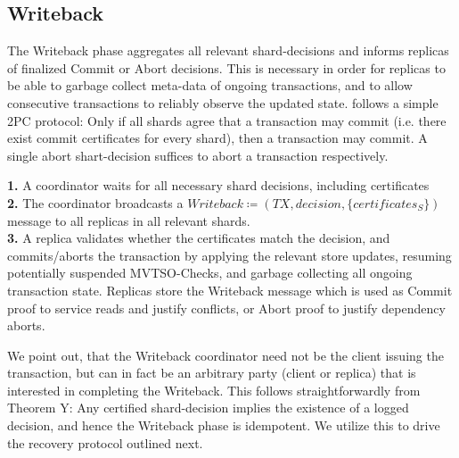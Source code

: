 \subsection{Writeback} 

The Writeback phase aggregates all relevant shard-decisions and informs replicas of finalized Commit or Abort decisions. This is necessary in order for replicas to be able to garbage collect meta-data of ongoing transactions, and to allow consecutive transactions to reliably observe the updated state. \sys follows a simple 2PC protocol: Only if all shards agree that a transaction may commit (i.e. there exist commit certificates for every shard), then a transaction may commit. A single abort shart-decision suffices to abort a transaction respectively.

\textbf{1.} A coordinator waits for all necessary shard decisions, including certificates\\
\textbf{2.} The coordinator broadcasts a $Writeback \coloneqq (TX, decision, \{certificates_S \} )$ message to all replicas in all relevant shards.\\
\textbf{3.} A replica validates whether the certificates match the decision, and commits/aborts the transaction by applying the relevant store updates, resuming potentially suspended MVTSO-Checks, and garbage collecting all ongoing transaction state. Replicas store the Writeback message which is used as Commit proof to service reads and justify conflicts, or Abort proof to justify dependency aborts.

We point out, that the Writeback coordinator need not be the client issuing the transaction, but can in fact be an arbitrary party (client or replica) that is interested in completing the Writeback. This follows straightforwardly from Theorem Y: Any certified shard-decision implies the existence of a logged decision, and hence the Writeback phase is idempotent.
We utilize this to drive the recovery protocol outlined next. 

